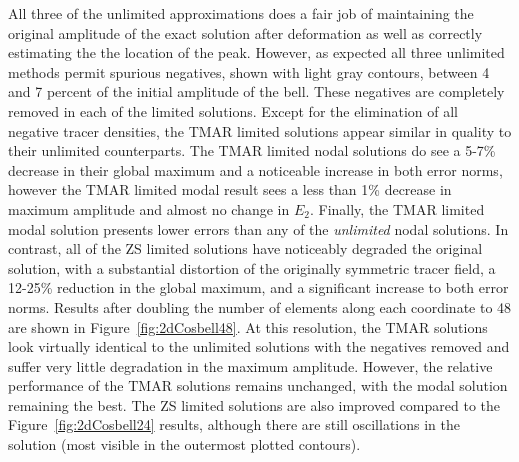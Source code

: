 \documentclass{ametsoc}
\begin{document}
All three of the unlimited approximations does a fair job of maintaining the original amplitude of the exact solution after deformation as well as correctly estimating the the location of the peak. However, as expected all three unlimited methods permit spurious negatives, shown with light gray contours, between 4 and 7 percent of the initial amplitude of the bell. These negatives are completely removed in each of the limited solutions. Except for the elimination of all negative tracer densities, the TMAR limited solutions appear similar in quality to their unlimited counterparts. The TMAR limited nodal solutions do see a 5-7\% decrease in their global maximum and a noticeable increase in both error norms, however the TMAR limited modal result sees a less than 1\% decrease in maximum amplitude and almost no change in $E_2$. Finally, the TMAR limited modal solution presents lower errors than any of the {\it unlimited} nodal solutions. In contrast, all of the ZS limited solutions have noticeably degraded the original solution, with a substantial distortion of the originally symmetric tracer field, a 12-25\% reduction in the global maximum, and a significant increase to both error norms. Results after doubling the number of elements along each coordinate to 48 are shown in Figure~\ref{fig:2dCosbell48}. At this resolution, the TMAR solutions look virtually identical to the unlimited solutions with the negatives removed and suffer very little degradation in the maximum amplitude. However, the relative performance of the TMAR solutions remains unchanged, with the modal solution remaining the best. The ZS limited solutions are also improved compared to the Figure~\ref{fig:2dCosbell24} results, although there are still oscillations in the solution (most visible in the outermost plotted contours).
\end{document}
